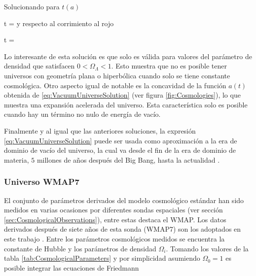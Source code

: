 Solucionando para $t(a)$


{ t = 
\ln{} }
y respecto al corrimiento al rojo


{ t = 
\ln{} }


Lo interesante de esta solución es que solo es válida para valores del
parámetro de densidad que satisfacen $0<\Omega_\Lambda <1$. Esto muestra 
que no es posible tener universos con geometría plana o hiperbólica cuando 
solo se tiene constante cosmológica. Otro aspecto igual de notable es la 
concavidad de la función $a(t)$ obtenida de \ref{eq:VacuumUniverseSolution}
(ver figura \ref{fig:Cosmologies}), lo que muestra una expansión acelerada
del universo. Esta característica solo es posible cuando hay un término no 
nulo de energía de vacío.


Finalmente y al igual que las anteriores soluciones, la expresión 
\ref{eq:VacuumUniverseSolution} puede ser usada como aproximación a la era
de dominio de vacío del universo, la cual va desde el fin de la era de 
dominio de materia, $5$ millones de años después del 
Big Bang, hasta la actualidad \cite{longair2008}.


			\subsubsection*{Universo WMAP7}
			
El conjunto de parámetros derivados del modelo cosmológico estándar han 
sido medidos en varias ocasiones por diferentes sondas espaciales (ver 
sección \ref{sec:CosmologicalObservations}), entre estas destaca el WMAP. 
Los datos derivados después de siete años de esta sonda (WMAP7) son los 
adoptados en este trabajo \cite{WMAP7}. Entre los parámetros cosmológicos 
medidos se encuentra la constante de Hubble y los parámetros de densidad 
$\Omega_i$. Tomando los valores de la tabla \ref{tab:CosmologicalParameters} 
y por simplicidad asumiendo $\Omega_0 = 1$ es posible integrar las 
ecuaciones de Friedmann


